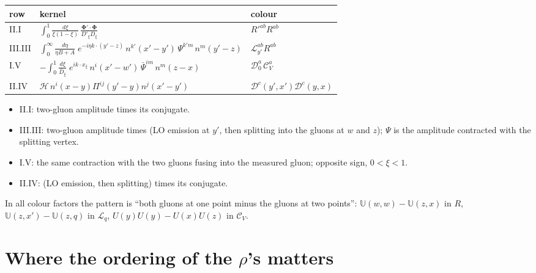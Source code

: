\documentclass[10pt]{article}
\numberwithin{equation}{section}
\begin{document}
\begin{center}
\renewcommand{\arraystretch}{1.5}
\begin{tabular}{l|l|l}
row & kernel & colour\\ \hline
II.I & $\displaystyle\int_{0}^{1}\frac{d\xi}{\xi(1-\xi)}\,\frac{\mathbf{\Phi}'\cdot\mathbf{\Phi}}{D'_{\xi}D_{\xi}}$ & $R'^{ab}R^{ab}$\\
III.III & $\displaystyle\int_{0}^{\infty}\frac{d\eta}{\eta B+A}\;e^{-i\eta k\cdot(y'-z)}\,n^{k'}(x'-y')\,\Psi^{k'm}\,n^{m}(y'-z)$ & $\mathcal{L}^{ab}_{y'}R^{ab}$\\
I.V & $\displaystyle-\int_{0}^{1}\frac{d\xi}{\bar D_{\xi}}\;e^{ik\cdot x_{\xi}}\,n^{i}(x'-w')\,\bar\Psi^{im}\,n^{m}(z-x)$ & $\mathcal{D}_{0}^{a}\,\mathcal{C}_{V}^{a}$\\
II.IV & $\mathcal{H}\,n^{i}(x-y)\Pi^{ij}(y'-y)n^{j}(x'-y')$ & $\mathcal{D}^{c}(y',x')\mathcal{D}^{c}(y,x)$
\end{tabular}
\end{center}
\begin{itemize}
\item II.I: two-gluon amplitude times its conjugate.
\item III.III: two-gluon amplitude times (LO emission at $y'$, then splitting into the gluons at $w$ and $z$); $\Psi$ is the amplitude contracted with the splitting vertex.
\item I.V: the same contraction with the two gluons fusing into the measured gluon; opposite sign, $0<\xi<1$.
\item II.IV: (LO emission, then splitting) times its conjugate.
\end{itemize}
In all colour factors the pattern is ``both gluons at one point minus the gluons at two points'': $\mathbb{U}(w,w)-\mathbb{U}(z,x)$ in $R$, $\mathbb{U}(z,x')-\mathbb{U}(z,q)$ in $\mathcal{L}_{q}$, $U(y)U(y)-U(x)U(z)$ in $\mathcal{C}_{V}$.

\section{Where the ordering of the $\rho$'s matters}\label{sec:order}
\end{document}
